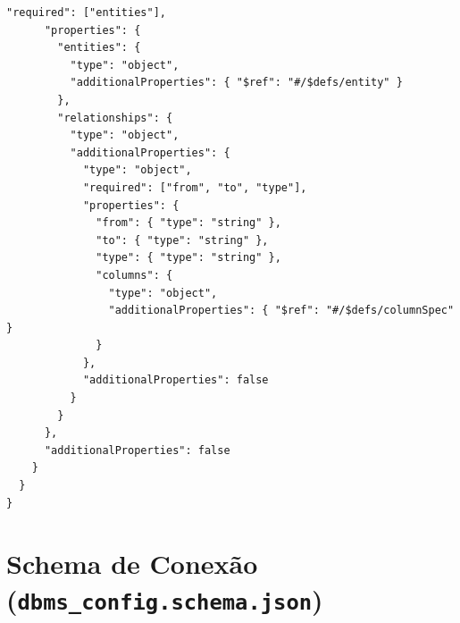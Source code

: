 \begin{lstlisting}[style=jsonstyle]
      "required": ["entities"],
      "properties": {
        "entities": {
          "type": "object",
          "additionalProperties": { "$ref": "#/$defs/entity" }
        },
        "relationships": {
          "type": "object",
          "additionalProperties": {
            "type": "object",
            "required": ["from", "to", "type"],
            "properties": {
              "from": { "type": "string" },
              "to": { "type": "string" },
              "type": { "type": "string" },
              "columns": {
                "type": "object",
                "additionalProperties": { "$ref": "#/$defs/columnSpec" }
              }
            },
            "additionalProperties": false
          }
        }
      },
      "additionalProperties": false
    }
  }
}
\end{lstlisting}

\section{Schema de Conexão (\texttt{dbms\_config.schema.json})}

